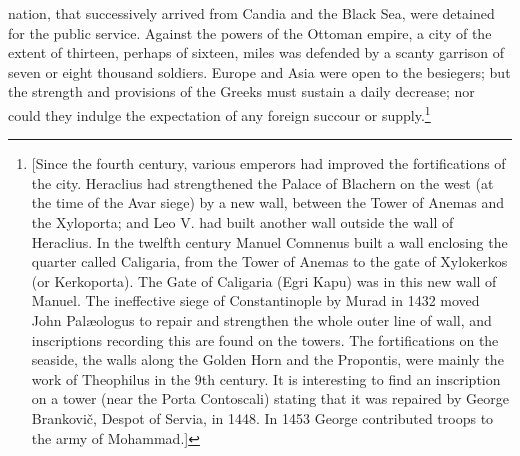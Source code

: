 nation, that successively arrived from Candia and the Black Sea, were detained for the public service. Against the powers of the Ottoman empire, a city of the extent of thirteen, perhaps of sixteen, miles was defended by a scanty garrison of seven or eight thousand soldiers. Europe and Asia were open to the besiegers; but the strength and provisions of the Greeks must sustain a daily decrease; nor could they indulge the expectation of any foreign succour or supply.\footnote{[Since the fourth century, various emperors had improved the fortifications of the city. Heraclius had strengthened the Palace of Blachern on the west (at the time of the Avar siege) by a new wall, between the Tower of Anemas and the Xyloporta; and Leo V. had built another wall outside the wall of Heraclius. In the twelfth century Manuel Comnenus built a wall enclosing the quarter called Caligaria, from the Tower of Anemas to the gate of Xylokerkos (or Kerkoporta). The Gate of Caligaria (Egri Kapu) was in this new wall of Manuel. The ineffective siege of Constantinople by Murad in 1432 moved John Palæologus to repair and strengthen the whole outer line of wall, and inscriptions recording this are found on the towers. The fortifications on the seaside, the walls along the Golden Horn and the Propontis, were mainly the work of Theophilus in the 9th century. It is interesting to find an inscription on a tower (near the Porta Contoscali) stating that it was repaired by George Brankovič, Despot of Servia, in 1448. In 1453 George contributed troops to the army of Mohammad.]}

